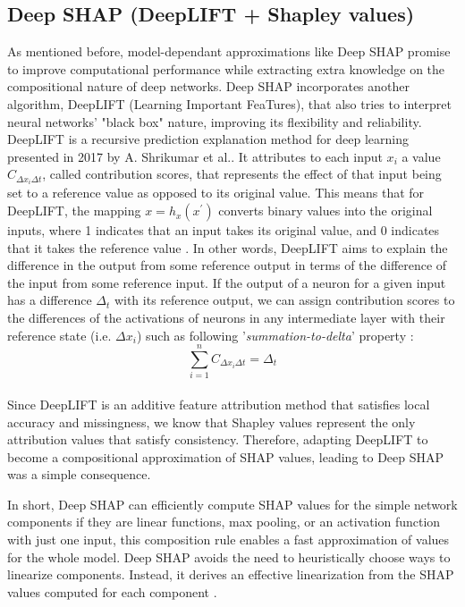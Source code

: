 \subsection{Deep SHAP (DeepLIFT + Shapley values)}
As mentioned before, model-dependant approximations like Deep SHAP promise to improve computational performance while extracting extra knowledge on the compositional nature of deep networks.
Deep SHAP incorporates another algorithm, DeepLIFT (Learning Important FeaTures), that also tries to interpret neural networks' "black box" nature, improving its flexibility and reliability. \\

DeepLIFT is a recursive prediction explanation method for deep learning presented in 2017 by A. Shrikumar et al.. It attributes to each input $x_{i}$ a value $C_{\Delta x_{i} \Delta t}$, called contribution scores, that represents the effect of that input being set to a reference value as opposed to its original value. This means that for DeepLIFT, the mapping $x = h_{x}(x^{'})$ converts binary values into the original inputs, where 1 indicates that an input takes its original value, and 0 indicates that it takes the reference value \cite{Interpreting-Model-Predictions}.
In other words, DeepLIFT aims to explain the difference in the output from some reference output in terms of the difference of the input from some reference input. If the output of a neuron for a given input has a difference $\Delta_{t}$ with its reference output, we can assign contribution scores to the differences of the activations of neurons in any intermediate layer with their reference state (i.e. $\Delta x_{i}$) such as following '\textit{summation-to-delta}' property \cite{DeepLIFT}:
\begin{equation}\label{eqn:summation-to-delta}
    \sum_{i=1}^{n}C_{\Delta x_{i} \Delta t} = \Delta_{t}
\end{equation}\\
Since DeepLIFT is an additive feature attribution method that satisfies local accuracy and missingness, we know that Shapley values represent the only attribution values that satisfy consistency. Therefore, adapting DeepLIFT to become a compositional approximation of SHAP values, leading to Deep SHAP was a simple consequence.

In short, Deep SHAP can efficiently compute SHAP values for the simple network components if they are linear functions, max pooling, or an activation function with just one input, this composition rule enables a fast approximation of values for the whole model. Deep SHAP avoids the need to heuristically choose ways to linearize components. Instead, it derives an effective linearization from the SHAP values computed for each component \cite{Interpreting-Model-Predictions}.\\

